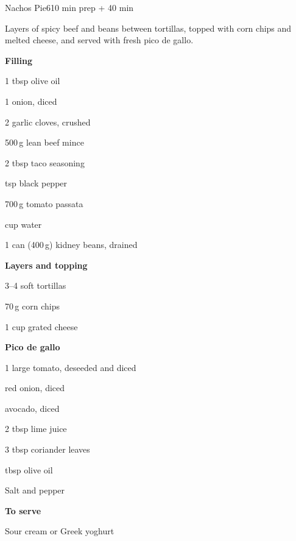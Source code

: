 \begin{recipebox}{Nachos Pie}{6}{10 min prep + 40 min}

Layers of spicy beef and beans between tortillas, topped with corn chips and
melted cheese, and served with fresh pico de gallo.

\begin{ingredients}
  \item[] \textbf{Filling}
  \item 1 tbsp olive oil
  \item 1 onion, diced
  \item 2 garlic cloves, crushed
  \item 500\,g lean beef mince
  \item 2 tbsp taco seasoning
  \item {} tsp black pepper
  \item 700\,g tomato passata
  \item {} cup water
  \item 1 can (400\,g) kidney beans, drained
  \item[] \textbf{Layers and topping}
  \item 3--4 soft tortillas
  \item 70\,g corn chips
  \item 1 cup grated cheese
  \item[] \textbf{Pico de gallo}
  \item 1 large tomato, deseeded and diced
  \item {} red onion, diced
  \item {} avocado, diced
  \item 2 tbsp lime juice
  \item 3 tbsp coriander leaves
  \item {} tbsp olive oil
  \item Salt and pepper
  \item[] \textbf{To serve}
  \item Sour cream or Greek yoghurt
\end{ingredients}


\end{recipebox}
